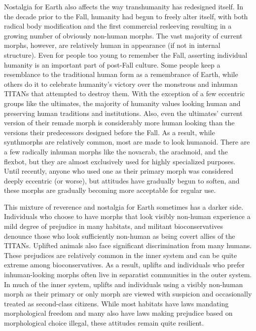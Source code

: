 Nostalgia for Earth also affects the way transhumanity
has redesigned itself. In the decade prior to
the Fall, humanity had begun to freely alter itself, 
with both radical body modification and the first 
commercial resleeving resulting in a growing number 
of obviously non-human morphs. The vast majority 
of current morphs, however, are relatively human 
in appearance (if not in internal structure). Even for 
people too young to remember the Fall, asserting 
individual humanity is an important part of post-Fall
culture. Some people keep a resemblance to the
traditional human form as a remembrance of Earth, 
while others do it to celebrate humanity's victory over 
the monstrous and inhuman TITANs that attempted 
to destroy them. With the exception of a few eccentric 
groups like the ultimates, the majority of humanity 
values looking human and preserving human traditions
and institutions. Also, even the ultimates' current
version of their remade morph is considerably
more human looking than the versions their predecessors
designed before the Fall. As a result, while synthmorphs
are relatively common, most are made to look
humanoid. There are a few radically inhuman morphs 
like the novacrab, the arachnoid, and the flexbot, but 
they are almost exclusively used for highly specialized 
purposes. Until recently, anyone who used one as their 
primary morph was considered deeply eccentric (or 
worse), but attitudes have gradually begun to soften, 
and these morphs are gradually becoming more acceptable
for regular use.

This mixture of reverence and nostalgia for Earth 
sometimes has a darker side. Individuals who choose 
to have morphs that look visibly non-human experience
a mild degree of prejudice in many habitats,
and militant bioconservatives denounce those who 
look sufficiently non-human as being covert allies 
of the TITANs. Uplifted animals also face significant 
discrimination from many humans. These prejudices 
are relatively common in the inner system and can 
be quite extreme among bioconservatives. As a result, 
uplifts and individuals who prefer inhuman-looking 
morphs often live in separatist communities in the 
outer system. In much of the inner system, uplifts and 
individuals using a visibly non-human morph as their 
primary or only morph are viewed with suspicion and 
occasionally treated as second-class citizens. While 
most habitats have laws mandating morphological 
freedom and many also have laws making prejudice 
based on morphological choice illegal, these attitudes 
remain quite resilient.

